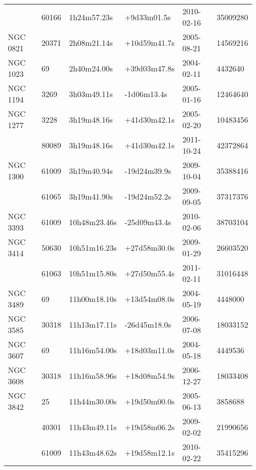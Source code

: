 \begin{table*}
\begin{center}
\begin{tabular}{llllll}
   & 60166 & 1h24m57.23s & +9d33m01.5s & 2010-02-16 & 35009280\\
  NGC 0821 & 20371 & 2h08m21.14s & +10d59m41.7s & 2005-08-21 & 14569216\\
  NGC 1023 & 69 & 2h40m24.00s & +39d03m47.8s & 2004-02-11 & 4432640\\
  NGC 1194 & 3269 & 3h03m49.11s & -1d06m13.4s & 2005-01-16 & 12464640\\
  NGC 1277 & 3228 & 3h19m48.16s & +41d30m42.1s & 2005-02-20 & 10483456\\
   & 80089 & 3h19m48.16s & +41d30m42.1s & 2011-10-24 & 42372864\\
  NGC 1300 & 61009 & 3h19m40.94s & -19d24m39.9s & 2009-10-04 & 35388416\\ 
   & 61065 & 3h19m41.90s & -19d24m52.2s & 2009-09-05 & 37317376\\
  NGC 3393 & 61009 & 10h48m23.46s & -25d09m43.4s & 2010-02-06 & 38703104\\
  NGC 3414 & 50630 & 10h51m16.23s & +27d58m30.0s & 2009-01-29 & 26603520\\
   & 61063 & 10h51m15.80s & +27d50m55.4s & 2011-02-11 & 31016448\\
  NGC 3489 & 69 & 11h00m18.10s & +13d54m08.0s & 2004-05-19 & 4448000\\
  NGC 3585 & 30318 & 11h13m17.11s & -26d45m18.0s & 2006-07-08 & 18033152\\
  NGC 3607 & 69 & 11h16m54.00s & +18d03m11.0s & 2004-05-18 & 4449536\\
  NGC 3608 & 30318 & 11h16m58.96s & +18d08m54.9s & 2006-12-27 & 18033408\\
  NGC 3842 & 25 & 11h44m30.00s & +19d50m00.0s & 2005-06-13 & 3858688\\
   & 40301 & 11h43m49.11s & +19d58m06.2s & 2009-02-02 & 21990656\\
   & 61009 & 11h43m48.62s & +19d58m12.1s & 2010-02-22 & 35415296\\
\hline
\end{tabular}
\end{center}
\end{table*}


